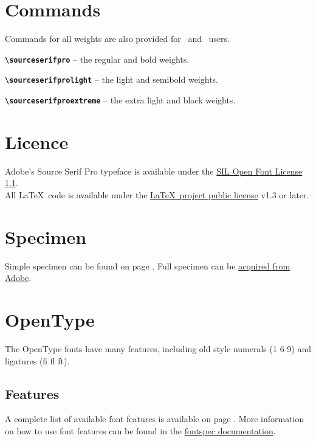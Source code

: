 \documentclass[10pt,a4paper,english]{article}
\begin{document}
\begin{multicols}{2}
\section{Commands}
Commands for all weights are also provided for \XeLaTeX\ and \LuaLaTeX\ users.
\begin{itemize*}
	\item \texttt{\bfseries \textbackslash sourceserifpro}
		-- the regular and bold weights.
	\item \texttt{\bfseries \textbackslash sourceserifprolight}
		-- the light and semibold weights.
	\item \texttt{\bfseries \textbackslash sourceserifproextreme}
		-- the extra light and black weights.
\end{itemize*}

\section{Licence}
Adobe's Source Serif Pro typeface is available under the \href{http://scripts.sil.org/OFL}{SIL Open Font License 1.1}.\\
All \LaTeX\ code is available under the \href{http://www.latex-project.org/lppl/}{\LaTeX\ project public license} v1.3 or later.

\section{Specimen}
Simple specimen can be found on page \pageref{sec:specimen}. Full specimen can be \href{http://store1.adobe.com/type/browser/pdfs/1966.pdf}{acquired from Adobe}.

\section{OpenType}
The OpenType fonts have many features, including old style numerals (1 6 9) and ligatures (fi fl ft).

\subsection{Features}
A complete list of available font features is available on page \pageref{sec:otfinfo}. More information on how to use font features can be found in the \href{http://mirror.ctan.org/macros/latex/contrib/fontspec/fontspec.pdf}{fontspec documentation}.


\end{multicols}
\end{document}

